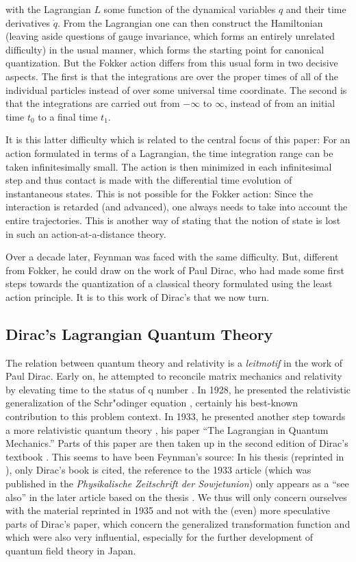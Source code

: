 \documentclass[12pt]{article}
\begin{document}
with the Lagrangian $L$ some function of the dynamical variables $q$ and their time derivatives $\dot{q}$. From the Lagrangian one can then construct the Hamiltonian (leaving aside questions of gauge invariance, which forms an entirely unrelated difficulty) in the usual manner, which forms the starting point for canonical quantization. But the Fokker action differs from this usual form in two decisive aspects. The first is that the integrations are over the proper times of all of the individual particles instead of over some universal time coordinate. The second is that the integrations are carried out from $-\infty$ to $\infty$, instead of from an initial time $t_0$ to a final time $t_1$.

It is this latter difficulty which is related to the central focus of this paper: For an action formulated in terms of a Lagrangian, the time integration range can be taken infinitesimally small. The action is then minimized in each infinitesimal step and thus contact is made with the differential time evolution of instantaneous states. This is not possible for the Fokker action: Since the interaction is retarded (and advanced), one always needs to take into account the entire trajectories. This is another way of stating that the notion of state is lost in such an action-at-a-distance theory. 

Over a decade later, Feynman was faced with the same difficulty. But, different from Fokker, he could draw on the work of Paul Dirac, who had made some first steps towards the quantization of a classical theory formulated using the least action principle. It is to this work of Dirac's that we now turn.

\subsection{Dirac's Lagrangian Quantum Theory}

The relation between quantum theory and relativity is a \emph{leitmotif} in the work of Paul Dirac. Early on, he attempted to reconcile matrix mechanics and relativity by elevating time to the status of q number \citep{dirac_1926_relativity}. In 1928, he presented the relativistic generalization of the Schr"odinger equation \citep{dirac_1928_the-quantum1}, certainly his best-known contribution to this problem context. In 1933, he presented another step towards a more relativistic quantum theory \citep{dirac_1933_the-lagrangian}, his paper ``The Lagrangian in Quantum Mechanics.'' Parts of this paper are then taken up in the second edition of Dirac's textbook \citep{dirac_1935_the-principles}. This seems to have been Feynman's source: In his thesis (reprinted in \citep{brown_2005_feynmans}), only Dirac's book is cited, the reference to the 1933 article (which was published in the \emph{Physikalische Zeitschrift der Sowjetunion}) only appears as a ``see also'' in the later article based on the thesis \citep{feynman_1948_space-time}. We thus will only concern ourselves with the material reprinted in 1935 and not with the (even) more speculative parts of Dirac's paper, which concern the generalized transformation function and which were also very influential, especially for the further development of quantum field theory in Japan.
\end{document}
